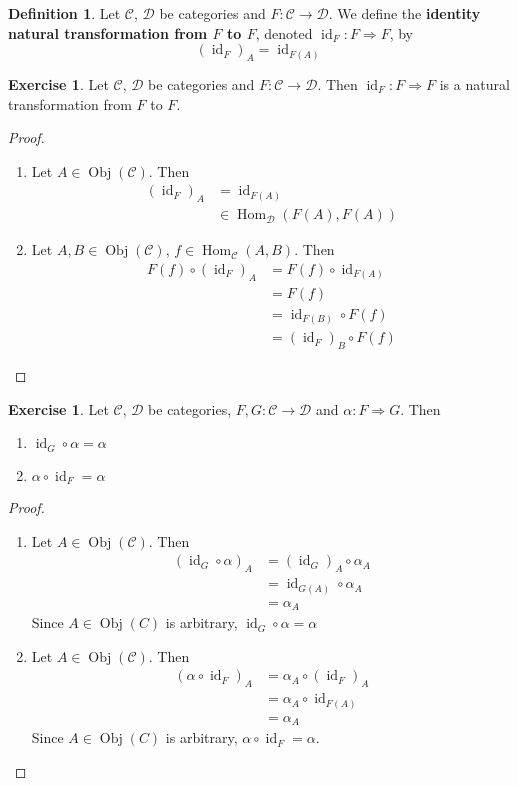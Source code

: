 \documentclass{book}
\theoremstyle{definition}
\newtheorem{defn}[definition]{Definition}
\newtheorem{ex}[definition]{Exercise}
\newcommand{\al}{\alpha}
\newcommand{\MC}{\mathcal{C}}
\newcommand{\MD}{\mathcal{D}}
\newcommand{\lex}[1]{\label{ex:#1}}
\newcommand{\ld}[1]{\label{defn:#1}}
\DeclareMathOperator{\id}{id}
\DeclareMathOperator{\Obj}{Obj}
\DeclareMathOperator{\Hom}{Hom}
\DeclareMathOperator*{\0}{\mbf{0}}
\DeclareMathOperator*{\1}{\mbf{1}}
\begin{document}
	\begin{defn} \ld{14003.2}
		Let $\MC$, $\MD$ be categories and $F: \MC \rightarrow \MD$. We define the \textbf{identity natural transformation from $F$ to $F$}, denoted $\id_{F}: F \Rightarrow F$, by 
		$$(\id_F)_A = \id_{F(A)}$$
	\end{defn}
	
	\begin{ex}  \lex{14003.3}
		Let $\MC$, $\MD$ be categories and $F: \MC \rightarrow \MD$. Then $\id_F: F \Rightarrow F$ is a natural transformation from $F$ to $F$.
	\end{ex}
	
	\begin{proof}\
		\begin{enumerate}
			\item Let $A \in \Obj(\MC)$. Then 
			\begin{align*}
				(\id_F)_A 
				& = \id_{F(A)} \\
				& \in \Hom_{\MD}(F(A), F(A))
			\end{align*}
			\item Let $A,B \in \Obj(\MC)$, $f \in \Hom_{\MC}(A,B)$. Then 
			\begin{align*}
				F(f) \circ (\id_{F})_{A} 
				& = F(f) \circ \id_{F(A)} \\
				& = F(f) \\
				& = \id_{F(B)} \circ F(f) \\
				& = (\id_{F})_{B} \circ F(f)
			\end{align*}
		\end{enumerate}
	\end{proof}

	\begin{ex} \lex{14003.4}
		Let $\MC$, $\MD$ be categories, $F,G: \MC \rightarrow \MD$ and $\al : F \Rightarrow G$. Then 
		\begin{enumerate}
			\item $\id_{G} \circ \al = \al$
			\item $\al \circ \id_F = \al$
		\end{enumerate} 
	\end{ex}

	\begin{proof}\
		\begin{enumerate}
			\item Let $A \in \Obj(\MC)$. Then 
			\begin{align*}
				(\id_{G} \circ \al)_{A}
				& = (\id_G)_A \circ \al_A \\
				& = \id_{G(A)} \circ \al_A \\
				& = \al_A 
			\end{align*}
			Since $A \in \Obj(C)$ is arbitrary, $\id_{G} \circ \al = \al$
			\item Let $A \in \Obj(\MC)$. Then
			\begin{align*}
				(\al \circ \id_F)_{A}
				& = \al_A \circ (\id_F)_A \\
				& = \al_A \circ \id_{F(A)} \\
				& = \al_A 
			\end{align*}
			Since $A \in \Obj(C)$ is arbitrary, $\al \circ \id_F = \al$.
		\end{enumerate}
	\end{proof}
\end{document}
